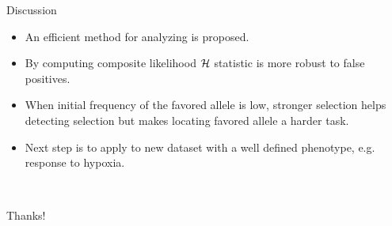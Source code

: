 \documentclass[t]{beamer} %
\begin{document}
\begin{frame}{ Discussion}
	\begin{itemize}
		\item An efficient method for analyzing  is proposed.
		\pause
		\item By computing composite likelihood ${\cal H}$ statistic is more robust 
		to false positives.	
		\pause 
		\item When initial frequency of the favored allele is low, stronger 
		selection helps detecting selection but makes locating favored allele a 
		harder task.
		\item Next step is to apply to new dataset with a well defined 
		phenotype, e.g. response to hypoxia.
	\end{itemize}
\end{frame}

\begin{frame}{\ }
	\vspace{1	in}
	\begin{center}
		\huge{Thanks!}\\
	\end{center}
	
\end{frame}
\end{document}
